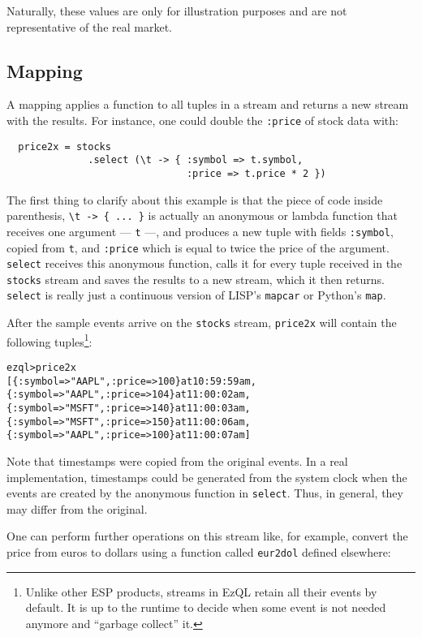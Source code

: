 \documentclass{report}
\newenvironment{evaluation}
{
  \framed
  \begin{alltt}
}
{
  \end{alltt}
  \endframed
}
\begin{document}
Naturally, these values are only for illustration purposes and are not
representative of the real market.

\subsection{Mapping}
\label{sec:mapping}
A mapping applies a function to all tuples in a stream and returns a
new stream with the results. For instance, one could double the
\verb=:price= of stock data with:

\begin{verbatim}
  price2x = stocks
              .select (\t -> { :symbol => t.symbol,
                               :price => t.price * 2 })
\end{verbatim}

The first thing to clarify about this example is that the piece of
code inside parenthesis, \verb!\t -> { ... }! is actually an anonymous
or lambda function that receives one argument --- \verb=t= ---, and
produces a new tuple with fields \verb=:symbol=, copied from \verb=t=,
and \verb=:price= which is equal to twice the price of the
argument. \verb=select= receives this anonymous function, calls it for
every tuple received in the \verb=stocks= stream and saves the results
to a new stream, which it then returns. \verb=select= is really just a
continuous version of LISP's \verb=mapcar= or Python's \verb=map=.

After the sample events arrive on the \verb=stocks= stream,
\verb=price2x= will contain the following tuples\footnote{Unlike other
  ESP products, streams in EzQL retain all their events by default. It
  is up to the runtime to decide when some event is not needed anymore
  and ``garbage collect'' it.}:

\begin{evaluation}
ezql> price2x
[\{ :symbol => "AAPL", :price => 100 \} at 10:59:59 am,
 \{ :symbol => "AAPL", :price => 104 \} at 11:00:02 am,
 \{ :symbol => "MSFT", :price => 140 \} at 11:00:03 am,
 \{ :symbol => "MSFT", :price => 150 \} at 11:00:06 am,
 \{ :symbol => "AAPL", :price => 100 \} at 11:00:07 am]
\end{evaluation}

Note that timestamps were copied from the original events. In a real
implementation, timestamps could be generated from the system clock
when the events are created by the anonymous function in
\verb=select=. Thus, in general, they may differ from the original.

One can perform further operations on this stream like, for example,
convert the price from euros to dollars using a function called
\verb=eur2dol= defined elsewhere:
\end{document}
